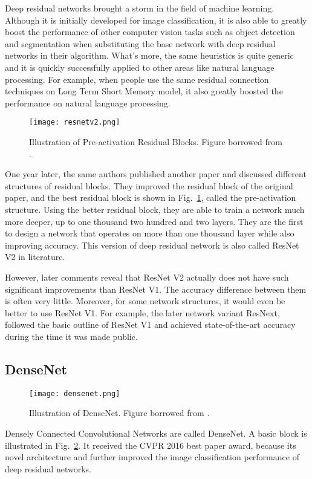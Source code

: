 Deep residual networks brought a storm in the field of machine learning. Although it is initially developed for image classification, it is also able to greatly boost the performance of other computer vision tasks such as object detection and segmentation when substituting the base network with deep residual networks in their algorithm. What's more, the same heuristics is quite generic and it is quickly successfully applied to other areas like natural language processing. For example, when people use the same residual connection techniques on Long Term Short Memory model, it also greatly boosted the performance on natural language processing.
\begin{figure}[!htp]
	\centering
	\texttt{[image: resnetv2.png]}
	\caption[Illustration of Pre-activation Residual Blocks]
	{Illustration of Pre-activation Residual Blocks. Figure borrowed from \parencite{he2016identity}.}
	\label{fig:resnetv2}
\end{figure}
One year later, the same authors published another paper\cite{he2016identity} and discussed different structures of residual blocks. They improved the residual block of the original paper, and the best residual block is shown in Fig.~\ref{fig:resnetv2}, called the pre-activation structure. Using the better residual block, they are able to train a network much more deeper, up to one thousand two hundred and two layers. They are the first to design a network that operates on more than one thousand layer while also improving accuracy. This version of deep residual network is also called ResNet V2 in literature. 

However, later comments reveal that ResNet V2 actually does not have such significant improvements than ResNet V1. The accuracy difference between them is often very little. Moreover, for some network structures, it would even be better to use ResNet V1. For example, the later network variant ResNext, followed the basic outline of ResNet V1 and achieved state-of-the-art accuracy during the time it was made public.

\subsection{DenseNet}
\begin{figure}[!htp]
	\centering
	\texttt{[image: densenet.png]}
	\caption[Illustration of DenseNet]
	{Illustration of DenseNet. Figure borrowed from \parencite{huang2017densely}.}
	\label{fig:densenet}
\end{figure}
Densely Connected Convolutional Networks\cite{huang2017densely} are called DenseNet. A basic block is illustrated in Fig.~\ref{fig:densenet}. It received the CVPR 2016 best paper award, because its novel architecture and further improved the image classification performance of deep residual networks.

